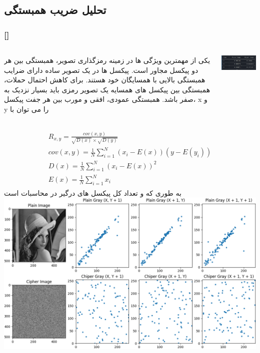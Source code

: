 \documentclass[xcolor=dvipsnames, professionalfonts, 11pt]{beamer}
\newcommand*{\makeframetitle}{\frametitle{\insertsection \hspace{0.1em} {\footnotesize [\insertsubsection]}}}
\begin{document}
\subsection{تحلیل ضریب همبستگی}
\begin{frame}[allowframebreaks]
    \makeframetitle
    \begin{columns}
        \begin{column}{0.5\textwidth}
             یکی از مهمترین ویژگی ها در زمینه رمزگذاری تصویر، همبستگی بین هر دو پیکسل مجاور است. پیکسل ها در یک تصویر ساده دارای ضرایب همبستگی بالایی با همسایگان خود هستند. برای کاهش احتمال حملات، همبستگی بین پیکسل های همسایه یک تصویر رمزی باید بسیار نزدیک به صفر باشد. همبستگی عمودی، افقی و مورب بین هر جفت پیکسل، x و y را می توان با
        \end{column}
        \begin{column}{0.5\textwidth}
            \begin{center}
                \includegraphics[width=\textwidth]{assets/result09.png}
             \end{center}
        \end{column}
    \end{columns}
    \framebreak
    \begin{align}
    \begin{split}
        R_{x,y} = \frac{cov(x,y)}{\sqrt{D(x)} \times \sqrt{D(y)}}\\
        cov(x,y) = \frac{1}{N}\sum_{i=1}^{N} (x_i - E(x))(y - E(y_i))\\
        D(x) = \frac{1}{N}\sum_{i=1}^{N} (x_i - E(x))^2\\
        E(x) = \frac{1}{N}\sum_{i=1}^{N} x_i
    \end{split}
    \end{align}
    \framebreak
    به طوری که
    و  تعداد کل پیکسل های درگیر در محاسبات است
    \includegraphics[width=\textwidth]{assets/result08.png}
\end{frame}
\end{document}

